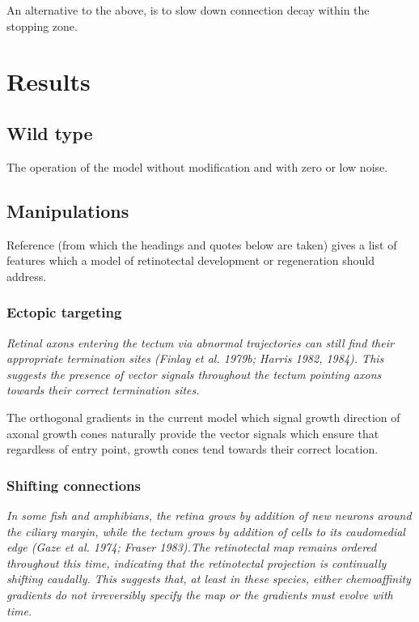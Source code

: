 \documentclass[11pt, a4paper]{article}
\begin{document}
An alternative to the above, is to slow down connection decay within the
stopping zone.

\section{Results}

\subsection{Wild type}

The operation of the model without modification and with zero or low noise.

\subsection{Manipulations}

Reference \cite{goodhill_development_2005} (from which the headings and quotes
below are taken) gives a list of features which a model of retinotectal
development or regeneration should address.

\subsubsection{Ectopic targeting}

\begin{displayquote}
\emph{Retinal axons entering the tectum via abnormal trajectories can still find
their appropriate termination sites (Finlay et al. 1979b; Harris 1982,
1984). This suggests the presence of vector signals throughout the tectum
pointing axons towards their correct termination sites.}
\end{displayquote}

The orthogonal gradients in the current model which signal growth direction of
axonal growth cones naturally provide the vector signals which ensure that
regardless of entry point, growth cones tend towards their correct location.

\subsubsection{Shifting connections}

\begin{displayquote}
\emph{In some fish and amphibians, the retina grows by addition of new neurons
around the ciliary margin, while the tectum grows by addition of cells to its
caudomedial edge (Gaze et al. 1974; Fraser 1983).The retinotectal map remains
ordered throughout this time, indicating that the retinotectal projection is
continually shifting caudally. This suggests that, at least in these species,
either chemoaffinity gradients do not irreversibly specify the map or the
gradients must evolve with time.}
\end{displayquote}
\end{document}
